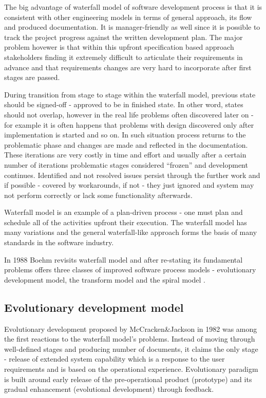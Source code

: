 The big advantage of waterfall model of software development process is that 
it is consistent with other engineering models in terms of general approach, 
its flow and produced documentation. 
It is manager-friendly as well since it is possible to track the project progress 
against the written development plan. 
The major problem hovewer is that within this upfront specification based approach 
stakeholders finding it extremely difficult to articulate their requirements in advance and 
that requirements changes are very hard to incorporate after first stages are passed.

During transition from stage to stage within the waterfall model, previous state 
should be signed-off - approved to be in finished state. In other 
word, states should not overlap, however in the real life problems often discovered
later on - for example it is often happens that problems with design 
discovered only after implementation is started and so on. In such situation
process returns to the problematic phase and changes are made and reflected in 
the documentation. These iterations are very costly in time and effort and 
usually after a certain number of iterations problematic stages considered 
``frozen'' and development continues. Identified and not resolved issues persist
through the further work and if possible - covered by workarounds, if not - 
they just ignored and system may not perform correctly or lack some functionality 
afterwards.

Waterfall model is an example of a plan-driven process - one must plan and schedule all 
of the activities upfront their execution. The waterfall model has many variations and 
the general waterfall-like approach forms the basis of many standards in the software industry.

In 1988 Boehm revisits waterfall model and after re-stating its fundamental problems 
offers three classes of improved software process models - evolutionary development 
model, the transform model and the spiral model \cite{citeulike:10002126}.

\subsection{Evolutionary development model}
Evolutionary development proposed by McCracken\&Jackson in 1982 \cite{citeulike:3996892}
was among the first reactions to the waterfall model's problems. Instead of moving 
through well-defined stages and producing number of documents, it claims the only
stage - release of extended system capability which is a response to the user 
requirements and is based on the operational experience. Evolutionary paradigm 
is built around early release of the pre-operational product (prototype) and its gradual 
enhancement (evolutional development) through feedback. 

